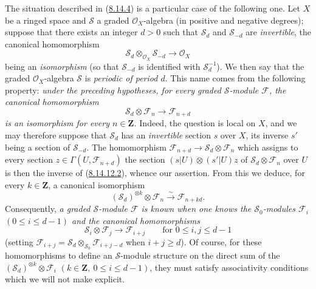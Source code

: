 \begin{remark}[8.14.12]
\label{II.8.14.12}
The situation described in (\hyperref[II.8.14.4]{8.14.4}) is a particular
case of the following one. Let $X$ be a ringed space and $\mathcal{S}$ a
graded $\mathcal{O}_X$-algebra (in positive and negative degrees); suppose
that there exists an integer $d>0$ such that $\mathcal{S}_d$ and
$\mathcal{S}_{-d}$ are \emph{invertible}, the canonical homomorphism
\begin{equation}
\label{II.8.14.12.1}
  \mathcal{S}_d\otimes_{\mathcal{O}_X}\mathcal{S}_{-d}
  \to\mathcal{O}_X
\tag{8.14.12.1}
\end{equation}
being an \emph{isomorphism} (so that $\mathcal{S}_{-d}$ is identified with
$\mathcal{S}_d^{-1}$). We then say that the graded $\mathcal{O}_X$-algebra
$\mathcal{S}$ is \emph{periodic of period $d$}. This name
comes from the following property: \emph{under the preceding hypotheses,
for every graded $\mathcal{S}$-module $\mathcal{F}$, the canonical
homomorphism}
\begin{equation}
\label{II.8.14.12.2}
  \mathcal{S}_d\otimes\mathcal{F}_n\to\mathcal{F}_{n+d}
\tag{8.14.12.2}
\end{equation}
\emph{is an isomorphism for every $n\in\mathbf{Z}$.} Indeed, the question
is local on $X$, and we may therefore suppose that $\mathcal{S}_d$ has an
\emph{invertible} section $s$ over $X$, its inverse $s'$ being a
section of $\mathcal{S}_{-d}$. The homomorphism
$\mathcal{F}_{n+d}\to\mathcal{S}_d\otimes\mathcal{F}_n$ which assigns to every
section $z\in\Gamma(U,\mathcal{F}_{n+d})$ the section
$(s|U)\otimes(s'|U)z$ of $\mathcal{S}_d\otimes\mathcal{F}_n$ over $U$ is
then the inverse of (\hyperref[II.8.14.12.2]{8.14.12.2}), whence our
assertion. From this we deduce, for every $k\in\mathbf{Z}$, a canonical
isomorphism
\[
  (\mathcal{S}_d)^{\otimes k}\otimes\mathcal{F}_n
  \xrightarrow{\sim}\mathcal{F}_{n+kd}.
\]
Consequently, \emph{a graded $\mathcal{S}$-module $\mathcal{F}$ is known
when one knows the $\mathcal{S}_0$-modules $\mathcal{F}_i$
$(0\leqslant i\leqslant d-1)$ and the canonical homomorphisms}
\[
  \mathcal{S}_i\otimes\mathcal{F}_j\to\mathcal{F}_{i+j}
  \qquad\text{for }0\leqslant i,j\leqslant d-1
\]
(setting
$\mathcal{F}_{i+j}=\mathcal{S}_d\otimes_{\mathcal{S}_0}
\mathcal{F}_{i+j-d}$ when $i+j\geqslant d$). Of course, for these
homomorphisms to define an $\mathcal{S}$-module structure on the
direct sum of the $(\mathcal{S}_d)^{\otimes k}\otimes\mathcal{F}_i$
$(k\in\mathbf{Z},\ 0\leqslant i\leqslant d-1)$, they must satisfy
associativity conditions which we will not make explicit.


\end{remark}
